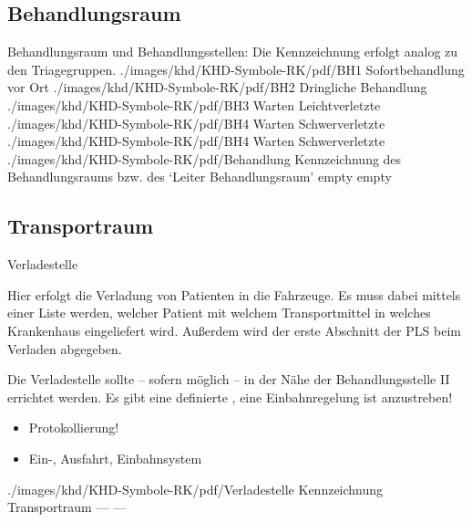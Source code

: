 \clearpage%


\subsection{Behandlungsraum}







\begin{PictureSeries}{}{Behandlungsraum und Behandlungsstellen: Die Kennzeichnung erfolgt analog zu den Triagegruppen.\label{fig:behandlungsstellen}}
{./images/khd/KHD-Symbole-RK/pdf/BH1}
{Sofortbehandlung vor Ort}
{./images/khd/KHD-Symbole-RK/pdf/BH2}
{Dringliche Behandlung}
{./images/khd/KHD-Symbole-RK/pdf/BH3}
{Warten Leichtverletzte}
{./images/khd/KHD-Symbole-RK/pdf/BH4}
{Warten Schwerverletzte}
{./images/khd/KHD-Symbole-RK/pdf/BH4}
{Warten Schwerverletzte}
{./images/khd/KHD-Symbole-RK/pdf/Behandlung}
{Kennzeichnung des Behandlungsraums bzw. des \enquote*{Leiter Behandlungsraum}}
{empty}
{}
{empty}
{}
\end{PictureSeries}

\subsection{Transportraum}


\TextSlideTeaser
{Verladestelle}%
{%
Hier erfolgt die Verladung von Patienten in die Fahrzeuge. 
Es muss dabei mittels einer Liste
 werden, welcher Patient mit welchem
Transportmittel in welches Krankenhaus eingeliefert wird. 
Außerdem  wird
der erste Abschnitt der PLS beim Verladen abgegeben.

Die Verladestelle sollte -- sofern möglich -- in der Nähe
der Behandlungsstelle II errichtet werden.
Es gibt eine definierte , eine
Einbahnregelung ist 
anzustreben! }%
{%
\begin{itemize}
  \item Protokollierung!
  \item Ein-, Ausfahrt, Einbahnsystem
\end{itemize}}%
{./images/khd/KHD-Symbole-RK/pdf/Verladestelle}%
{Kennzeichnung Transportraum}%
{}%
{---}%
{---}%



